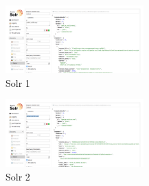 \documentclass{article}
\begin{document}
\begin{center}
\begin{figure}[ht]
    \centering
    \includegraphics[width=0.475\textwidth,natwidth=700,natheight=700]{solar_public_prefix.png}
    \caption{Solr 1}
    \label{fig:solr1}
\end{figure}
\begin{figure}[ht]
    \centering
    \includegraphics[width=0.475\textwidth,natwidth=700,natheight=700]{solr_domain_twitter.png}
    \caption{Solr 2}
    \label{fig:solr2}
\end{figure}
\end{center}

\clearpage
\end{document}
